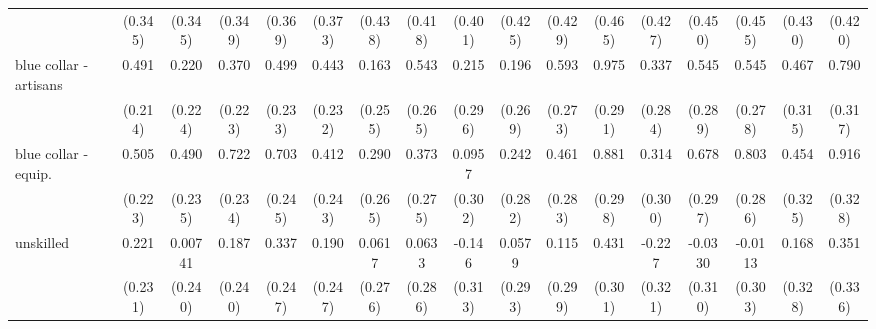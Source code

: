 {\begin{tabular}{l*{16}{c}}
                    &     (0.345)         &     (0.345)         &     (0.349)         &     (0.369)         &     (0.373)         &     (0.438)         &     (0.418)         &     (0.401)         &     (0.425)         &     (0.429)         &     (0.465)         &     (0.427)         &     (0.450)         &     (0.455)         &     (0.430)         &     (0.420)         \\
[1em]
blue collar - artisans&       0.491\sym{*}  &       0.220         &       0.370         &       0.499\sym{*}  &       0.443         &       0.163         &       0.543\sym{*}  &       0.215         &       0.196         &       0.593\sym{*}  &       0.975\sym{***}&       0.337         &       0.545         &       0.545         &       0.467         &       0.790\sym{*}  \\
                    &     (0.214)         &     (0.224)         &     (0.223)         &     (0.233)         &     (0.232)         &     (0.255)         &     (0.265)         &     (0.296)         &     (0.269)         &     (0.273)         &     (0.291)         &     (0.284)         &     (0.289)         &     (0.278)         &     (0.315)         &     (0.317)         \\
[1em]
blue collar - equip.&       0.505\sym{*}  &       0.490\sym{*}  &       0.722\sym{**} &       0.703\sym{**} &       0.412         &       0.290         &       0.373         &      0.0957         &       0.242         &       0.461         &       0.881\sym{**} &       0.314         &       0.678\sym{*}  &       0.803\sym{**} &       0.454         &       0.916\sym{**} \\
                    &     (0.223)         &     (0.235)         &     (0.234)         &     (0.245)         &     (0.243)         &     (0.265)         &     (0.275)         &     (0.302)         &     (0.282)         &     (0.283)         &     (0.298)         &     (0.300)         &     (0.297)         &     (0.286)         &     (0.325)         &     (0.328)         \\
[1em]
unskilled           &       0.221         &     0.00741         &       0.187         &       0.337         &       0.190         &      0.0617         &      0.0633         &      -0.146         &      0.0579         &       0.115         &       0.431         &      -0.227         &     -0.0330         &     -0.0113         &       0.168         &       0.351         \\
                    &     (0.231)         &     (0.240)         &     (0.240)         &     (0.247)         &     (0.247)         &     (0.276)         &     (0.286)         &     (0.313)         &     (0.293)         &     (0.299)         &     (0.301)         &     (0.321)         &     (0.310)         &     (0.303)         &     (0.328)         &     (0.336)         \\

\end{tabular}}
